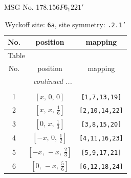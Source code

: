 \documentclass[fleqn,8pt]{jsarticle}
\begin{document}
\setcounter{MaxMatrixCols}{32}

\renewcommand{\tablename}{Table~}
\renewcommand{\figurename}{Figure~}
\begin{center}
\LARGE
MSG No. 178.156\quad$P6_{1}221'$
\end{center}
\renewcommand{\arraystretch}{1.2}
\begin{longtable}{ccc}
\caption{Wyckoff site: {\tt 6a}, site symmetry: {\tt .2.1'}}
 \\
 \hline \hline
No. & position & mapping \\ \hline \endfirsthead

\multicolumn{2}{l}{\tablename\ \thetable{}} \\
 \hline \hline
No. & position & mapping \\ \hline \endhead

 \hline \hline
\multicolumn{2}{r}{\footnotesize\it continued ...} \\ \endfoot

 \hline \hline
\multicolumn{2}{r}{} \\ \endlastfoot

1 & $\left[ x,\, 0,\, 0 \right]$ & {\tt [1,7,13,19]} \\ \hline
2 & $\left[ x,\, x,\, \frac{1}{6} \right]$ & {\tt [2,10,14,22]} \\ \hline
3 & $\left[ 0,\, x,\, \frac{1}{3} \right]$ & {\tt [3,8,15,20]} \\ \hline
4 & $\left[ - x,\, 0,\, \frac{1}{2} \right]$ & {\tt [4,11,16,23]} \\ \hline
5 & $\left[ - x,\, - x,\, \frac{2}{3} \right]$ & {\tt [5,9,17,21]} \\ \hline
6 & $\left[ 0,\, - x,\, \frac{5}{6} \right]$ & {\tt [6,12,18,24]} \\
\end{longtable}
\renewcommand{\arraystretch}{1.2}
\end{document}
